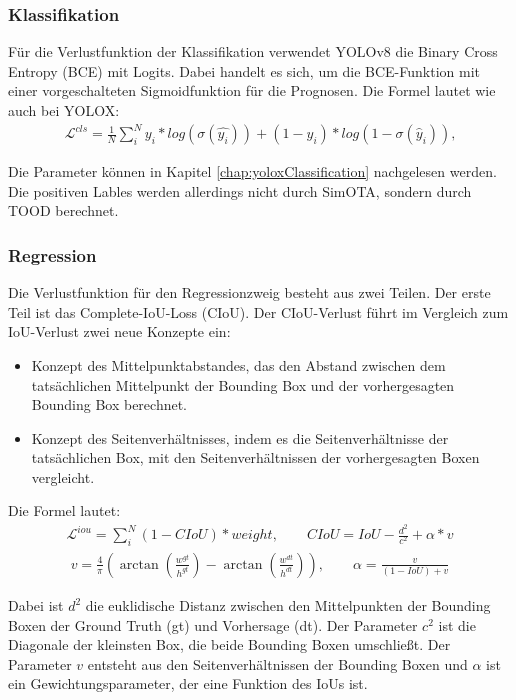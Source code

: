 \subsubsection{Klassifikation} 
Für die Verlustfunktion der Klassifikation verwendet YOLOv8 die Binary Cross Entropy (BCE) mit Logits. Dabei handelt es sich, um die BCE-Funktion mit einer vorgeschalteten Sigmoidfunktion für die Prognosen.
Die Formel lautet wie auch bei YOLOX:
\begin{align}
	\mathcal{L}^{cls}=\frac{1}{N}\sum_{i}^{N}y_i*log(\sigma(\hat{y_i}))+(1-y_i)*log(1-\sigma(\hat{y}_i)) \text{,}
\end{align}

Die Parameter können in Kapitel \ref{chap:yoloxClassification} nachgelesen werden. Die positiven Lables werden allerdings nicht durch SimOTA, sondern durch TOOD berechnet.

\subsubsection{Regression} 
Die Verlustfunktion für den Regressionzweig besteht aus zwei Teilen. Der erste Teil ist das Complete-IoU-Loss (CIoU). Der CIoU-Verlust führt im Vergleich zum IoU-Verlust zwei neue Konzepte ein:
\begin{itemize}
\item Konzept des Mittelpunktabstandes, das den Abstand zwischen dem tatsächlichen Mittelpunkt der Bounding Box und der vorhergesagten Bounding Box berechnet.
\item Konzept des Seitenverhältnisses, indem es die Seitenverhältnisse der tatsächlichen Box, mit den Seitenverhältnissen der vorhergesagten Boxen vergleicht.
\end{itemize}

Die Formel lautet:
\begin{align}
	\mathcal{L}^{iou}=\sum_{i}^{N}(1-CIoU)*weight, \qquad 	CIoU = IoU - \frac{d^2}{c^2}+\alpha*v
\end{align}
\begin{align}
	v=\frac{4}{\pi}(\arctan(\frac{w^{gt}}{h^{gt}})-\arctan(\frac{w^{dt}}{h^{dt}})), \qquad \alpha=\frac{v}{(1-IoU)+v}
\end{align}

Dabei ist $d^2$ die euklidische Distanz zwischen den Mittelpunkten der Bounding Boxen der Ground Truth (gt) und Vorhersage (dt). Der Parameter $c^2$ ist die Diagonale der kleinsten Box, die beide Bounding Boxen umschließt. Der Parameter $v$ entsteht aus den Seitenverhältnissen der Bounding Boxen und $\alpha$ ist ein Gewichtungsparameter, der eine Funktion des IoUs ist. \cite{ciouLoss}


